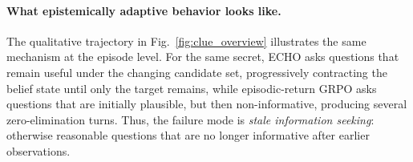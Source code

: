 \documentclass[11pt]{article}
\theoremstyle{plain}
\theoremstyle{definition}
\theoremstyle{remark}
\begin{document}





\paragraph{What epistemically adaptive behavior looks like.}
The qualitative trajectory in Fig.~\ref{fig:clue_overview} illustrates the same mechanism at the episode level. For the same secret, \textsc{ECHO} asks questions that remain useful under the changing candidate set, progressively contracting the belief state until only the target remains, while episodic-return GRPO asks questions that are initially plausible, but then non-informative, producing several zero-elimination turns. Thus, the failure mode is \emph{stale information seeking}: otherwise reasonable questions that are no longer informative after earlier observations.
\end{document}
